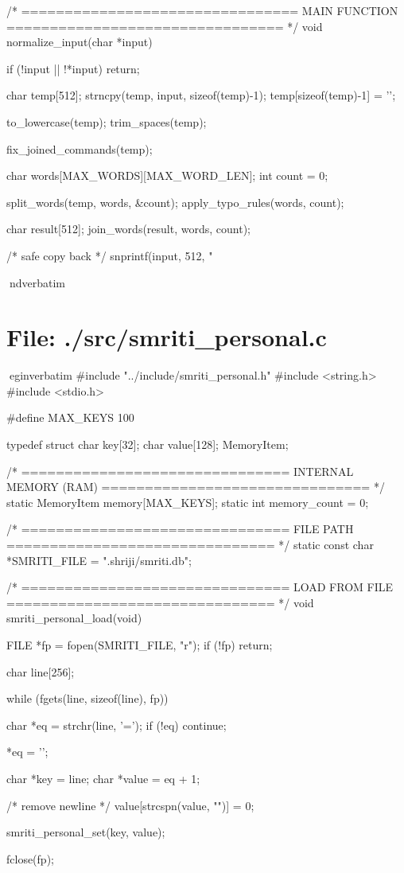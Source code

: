 \documentclass{article}
\begin{document}
/* ================================
   MAIN FUNCTION
================================ */
void normalize_input(char *input)
{

    if (!input || !*input)
        return;

    char temp[512];
    strncpy(temp, input, sizeof(temp)-1);
    temp[sizeof(temp)-1] = '\0';

    to_lowercase(temp);
    trim_spaces(temp);

    fix_joined_commands(temp);

    char words[MAX_WORDS][MAX_WORD_LEN];
    int count = 0;

    split_words(temp, words, &count);
    apply_typo_rules(words, count);

char result[512];
join_words(result, words, count);

/* safe copy back */
snprintf(input, 512, "%
}
nd{verbatim}
\section*{File: ./src/smriti_personal.c}
egin{verbatim}
#include "../include/smriti_personal.h"
#include <string.h>
#include <stdio.h>

#define MAX_KEYS 100

typedef struct {
    char key[32];
    char value[128];
} MemoryItem;

/* ===============================
   INTERNAL MEMORY (RAM)
   =============================== */
static MemoryItem memory[MAX_KEYS];
static int memory_count = 0;

/* ===============================
   FILE PATH
   =============================== */
static const char *SMRITI_FILE = ".shriji/smriti.db";

/* ===============================
   LOAD FROM FILE
   =============================== */
void smriti_personal_load(void)
{
    FILE *fp = fopen(SMRITI_FILE, "r");
    if (!fp) return;

    char line[256];

    while (fgets(line, sizeof(line), fp))
    {
        char *eq = strchr(line, '=');
        if (!eq) continue;

        *eq = '\0';

        char *key = line;
        char *value = eq + 1;

        /* remove newline */
        value[strcspn(value, "\n")] = 0;

        smriti_personal_set(key, value);
    }

    fclose(fp);
}
\end{document}
